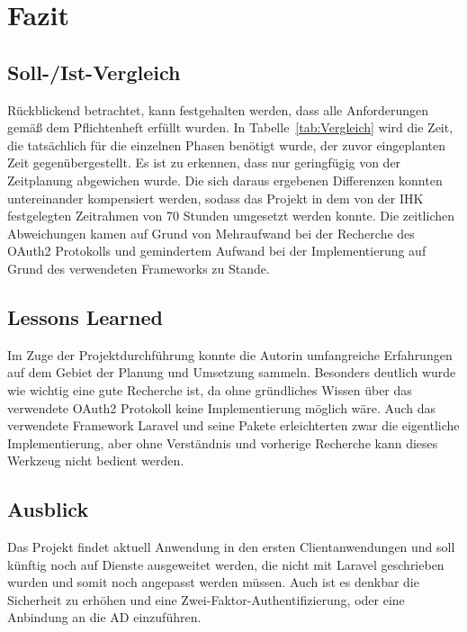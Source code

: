 \section{Fazit} 
\label{sec:Fazit}

\subsection{Soll-/Ist-Vergleich}
\label{sec:SollIstVergleich}
Rückblickend betrachtet, kann festgehalten werden, dass alle Anforderungen gemäß dem Pflichtenheft erfüllt wurden. 
In Tabelle~\ref{tab:Vergleich} wird die Zeit, die tatsächlich für die einzelnen Phasen benötigt wurde, der zuvor eingeplanten Zeit gegenübergestellt. 
Es ist zu erkennen, dass nur geringfügig von der Zeitplanung abgewichen wurde. Die sich daraus ergebenen Differenzen konnten untereinander kompensiert werden, sodass das Projekt in dem von der IHK festgelegten Zeitrahmen von 70 Stunden umgesetzt werden konnte.
Die zeitlichen Abweichungen kamen auf Grund von Mehraufwand bei der Recherche des OAuth2 Protokolls und gemindertem Aufwand bei der Implementierung auf Grund des verwendeten Frameworks zu Stande.

\subsection{Lessons Learned}
\label{sec:LessonsLearned}
Im Zuge der Projektdurchführung konnte die Autorin umfangreiche Erfahrungen auf dem Gebiet der Planung und Umsetzung sammeln.
Besonders deutlich wurde wie wichtig eine gute Recherche ist, da ohne gründliches Wissen über das verwendete OAuth2 Protokoll keine Implementierung möglich wäre.
Auch das verwendete Framework Laravel und seine Pakete erleichterten zwar die eigentliche Implementierung, aber ohne Verständnis und vorherige Recherche kann dieses Werkzeug nicht bedient werden. 
\subsection{Ausblick}
\label{sec:Ausblick}
Das Projekt findet aktuell Anwendung in den ersten Clientanwendungen und soll künftig noch auf Dienste ausgeweitet werden, die nicht mit Laravel geschrieben wurden und somit noch angepasst werden müssen. Auch ist es denkbar die Sicherheit zu erhöhen und eine Zwei-Faktor-Authentifizierung, oder eine Anbindung an die AD einzuführen.
